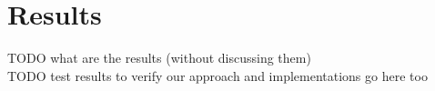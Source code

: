 \chapter{Results}
TODO what are the results (without discussing them)\\
TODO test results to verify our approach and implementations go here too\\
